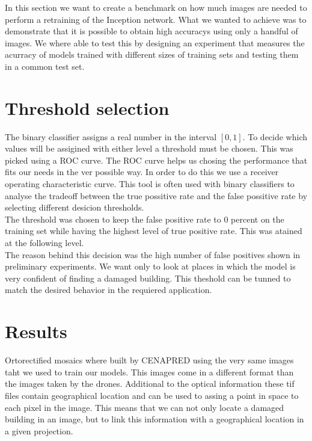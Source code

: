 In this section we want to create a benchmark on how much images are needed to perform a retraining of the Inception network. What we wanted to achieve was to demonstrate that it is possible to obtain high accuracys using only a handful of images. We where able to test this by designing an experiment that measures the acurracy of models trained with different sizes of training sets and testing them in a common test set.\\


\section{Threshold selection}

The binary classifier assigns a real number in the interval $[0,1]$. To decide which values will be assigined with either level a threshold must be chosen. This was picked using a ROC curve. The ROC curve helps us chosing the performance that fits our needs in the ver possible way. In order to do this we use a receiver operating characteristic curve. This tool is often used with binary classifiers to analyse the tradeoff between the true possitive rate and the false possitive rate by selecting different desicion thresholds.\\

The threshold was chosen to keep the false positive rate to 0 percent on the training set while having the highest level of true positive rate. This was atained at the following level.\\

The reason behind this decision was the high number of false positives shown in preliminary experiments. We want only to look at places in which the model is very confident of finding a damaged building. This theshold can be tunned to match the desired behavior in the requiered application.\\

\section{Results}

Ortorectified mosaics where built by CENAPRED using the very same images taht we used to train our models. This images come in a different format than the images taken by the drones. Additional to the optical information these tif files contain geographical location and can be used to assing a point in space to each pixel in the image. This means that we can not only locate a damaged building in an image, but to link this information with a geographical location in a given projection.\\

